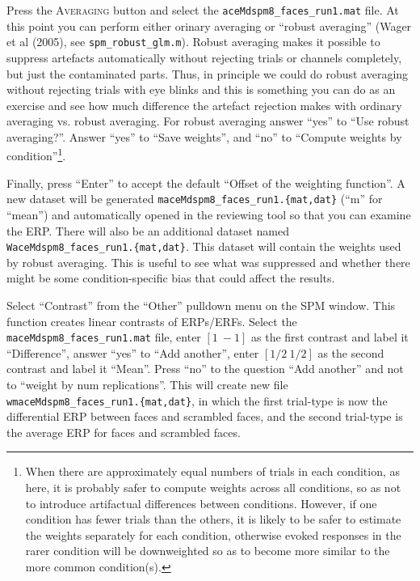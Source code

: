 Press the \textsc{Averaging} button and select the \texttt{aceMdspm8\_faces\_run1.mat} file. At this point you can perform either orinary averaging or ``robust averaging'' (Wager et al (2005), see \texttt{spm\_robust\_glm.m}). Robust averaging makes it possible to suppress artefacts automatically without rejecting trials or channels completely, but just the contaminated parts. Thus, in principle we could do robust averaging without rejecting trials with eye blinks and this is something you can do as an exercise and see how much difference the artefact rejection makes with ordinary averaging vs. robust averaging. For robust averaging answer ``yes'' to ``Use robust averaging?''. Answer ``yes'' to ``Save weights'', and ``no'' to ``Compute weights by condition''\footnote{When there are approximately equal numbers of trials in each condition, as here, it is probably safer to compute weights across all conditions, so as not to introduce artifactual differences between conditions. However, if one condition has fewer trials than the others, it is likely to be safer to estimate the weights separately for each condition, otherwise evoked responses in the rarer condition will be downweighted so as to become more similar to the more common condition(s).}.

Finally, press ``Enter'' to accept the default ``Offset of the weighting function''. A new dataset will be generated \texttt{maceMdspm8\_faces\_run1.\{mat,dat\}} (``m'' for ``mean'') and automatically opened in the reviewing tool so that you can examine the ERP. There will also be an additional dataset named \texttt{WaceMdspm8\_faces\_run1.\{mat,dat\}}. This dataset will contain the weights used by robust averaging. This is useful to see what was suppressed and whether there might be some condition-specific bias that could affect the results.

Select ``Contrast'' from the ``Other'' pulldown menu on the SPM window. This function creates linear contrasts of ERPs/ERFs. Select the \texttt{maceMdspm8\_\-faces\_\-run1.mat} file,  enter $[1\: -1]$ as the first contrast and label it ``Difference'', answer ``yes'' to ``Add another'',  enter $[1/2\: 1/2]$ as the second contrast and label it ``Mean''. Press ``no'' to the question ``Add another'' and not to ``weight by num replications''. This will create new file \texttt{wmaceMdspm8\_faces\_run1.\{mat,dat\}}, in which the first trial-type is now the differential ERP between faces and scrambled faces, and the second trial-type is the average ERP for faces and scrambled faces.

